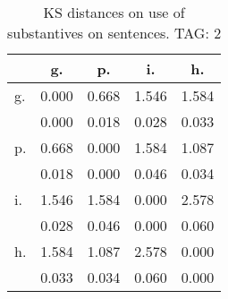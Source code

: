 \begin{table}[h!]
\begin{center}
\begin{tabular}{| l | c | c | c | c |}\hline
 & g. & p. & i. & h. \\\hline
g. & 0.000  & 0.668  & 1.546  & 1.584 \\\hline
 & 0.000  & 0.018  & 0.028  & 0.033 \\\hline
p. & 0.668  & 0.000  & 1.584  & 1.087 \\\hline
 & 0.018  & 0.000  & 0.046  & 0.034 \\\hline
i. & 1.546  & 1.584  & 0.000  & 2.578 \\\hline
 & 0.028  & 0.046  & 0.000  & 0.060 \\\hline
h. & 1.584  & 1.087  & 2.578  & 0.000 \\\hline
 & 0.033  & 0.034  & 0.060  & 0.000 \\\hline
\end{tabular}
\caption{KS distances on use of substantives on sentences. TAG: 2}
\end{center}
\end{table}